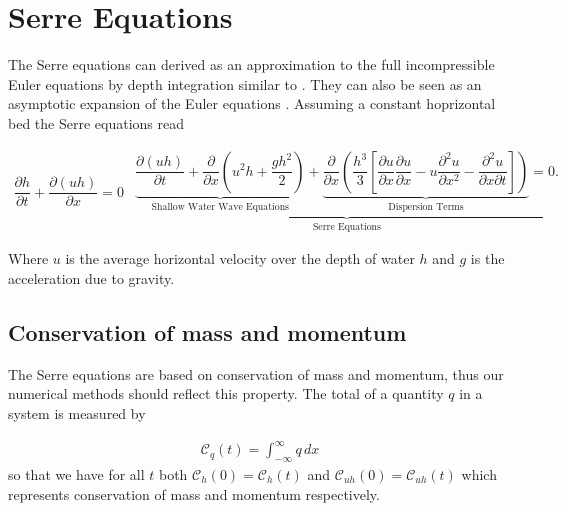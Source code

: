 \documentclass[SingleSpace,12pt,Journal]{Serre_ASCE}
\begin{document}
\section{Serre Equations}
\label{section:Serre Equations}
The Serre equations can derived as an approximation to the full incompressible Euler equations by depth integration similar to \cite{Su-Gardener-1969-536}. They can also be seen as an asymptotic expansion of the Euler equations \cite{Bonneton-Lannes-2009-16601}. Assuming a constant hoprizontal bed the Serre equations read \cite{Guyenne-etal-2014-169}
\begin{linenomath*}
\begin{subequations}\label{eq:Serre_nonconservative_form}
\begin{gather}
\dfrac{\partial h}{\partial t} + \dfrac{\partial (uh)}{\partial x} = 0
\label{eq:Serre_continuity}
\end{gather}
\begin{gather}
\underbrace{\underbrace{\dfrac{\partial (uh)}{\partial t} + \dfrac{\partial}{\partial x} \left ( u^2h + \dfrac{gh^2}{2}\right )}_{\text{Shallow Water Wave Equations}} + \underbrace{\dfrac{\partial}{\partial x} \left (  \dfrac{h^3}{3} \left [ \dfrac{\partial u }{\partial x} \dfrac{\partial u}{\partial x} - u\dfrac{\partial^2 u}{\partial x^2}  - \dfrac{\partial^2 u}{\partial x \partial t}\right ] \right )}_{\text{Dispersion Terms}} = 0.}_{\text{Serre Equations}}
\label{eq:Serre_momentum}
\end{gather}
\end{subequations}
\end{linenomath*}
Where $u$ is the average horizontal velocity over the depth of water $h$ and $g$ is the acceleration due to gravity. 
\subsection{Conservation of mass and momentum}
The Serre equations are based on conservation of mass and momentum, thus our numerical methods should reflect this property. The total of a quantity $q$ in a system is measured by

\begin{gather}
\label{eqn:Condef}
\mathcal{C}_q(t) = \int_{-\infty}^{\infty} q\, dx
\end{gather}
so that we have for all $t$ both $\mathcal{C}_{h}(0) = \mathcal{C}_{h}(t)$ and $\mathcal{C}_{uh}(0) = \mathcal{C}_{uh}(t)$ which represents conservation of mass and momentum respectively.
\end{document}

